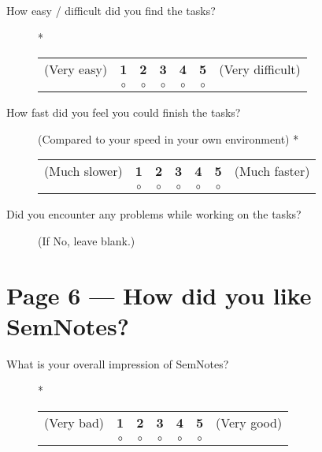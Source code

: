 \begin{description}
 \item[How easy / difficult did you find the tasks?] *

\begin{tabular}{ccccccc}
(Very easy) & \textbf{1} & \textbf{2} & \textbf{3} & \textbf{4} & \textbf{5} & (Very difficult) \\
& $\circ$ & $\circ$ & $\circ$ & $\circ$ & $\circ$ & \\
\end{tabular}
\end{description}

\begin{description}
 \item[How fast did you feel you could finish the tasks?] (Compared to your speed in your own environment) *

\begin{tabular}{ccccccc}
(Much slower) & \textbf{1} & \textbf{2} & \textbf{3} & \textbf{4} & \textbf{5} & (Much faster) \\
& $\circ$ & $\circ$ & $\circ$ & $\circ$ & $\circ$ & \\
\end{tabular}
\end{description}

\begin{description}
 \item[Did you encounter any problems while working on the tasks?] (If No, leave blank.)
\end{description}

\section*{Page 6 --- How did you like SemNotes?}

\begin{description}
 \item[What is your overall impression of SemNotes?] *

\begin{tabular}{ccccccc}
(Very bad) & \textbf{1} & \textbf{2} & \textbf{3} & \textbf{4} & \textbf{5} & (Very good) \\
& $\circ$ & $\circ$ & $\circ$ & $\circ$ & $\circ$ & \\
\end{tabular}
\end{description}

